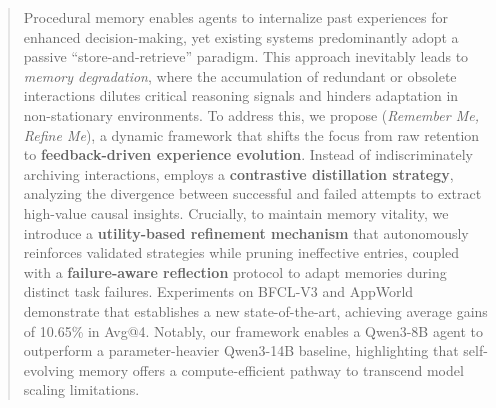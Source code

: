 \begin{abstract}
Procedural memory enables agents to internalize past experiences for enhanced decision-making, yet existing systems predominantly adopt a passive ``store-and-retrieve'' paradigm.
This approach inevitably leads to \textit{memory degradation}, where the accumulation of redundant or obsolete interactions dilutes critical reasoning signals and hinders adaptation in non-stationary environments.
To address this, we propose \textbf{\ours} (\textit{Remember Me, Refine Me}), a dynamic framework that shifts the focus from raw retention to \textbf{feedback-driven experience evolution}.
Instead of indiscriminately archiving interactions, {\ours} employs a \textbf{contrastive distillation strategy}, analyzing the divergence between successful and failed attempts to extract high-value causal insights.
Crucially, to maintain memory vitality, we introduce a \textbf{utility-based refinement mechanism} that autonomously reinforces validated strategies while pruning ineffective entries, coupled with a \textbf{failure-aware reflection} protocol to adapt memories during distinct task failures.
Experiments on BFCL-V3 and AppWorld demonstrate that {\ours} establishes a new state-of-the-art, achieving average gains of 10.65\% in Avg@4.
Notably, our framework enables a Qwen3-8B agent to outperform a parameter-heavier Qwen3-14B baseline, highlighting that self-evolving memory offers a compute-efficient pathway to transcend model scaling limitations.
\end{abstract}